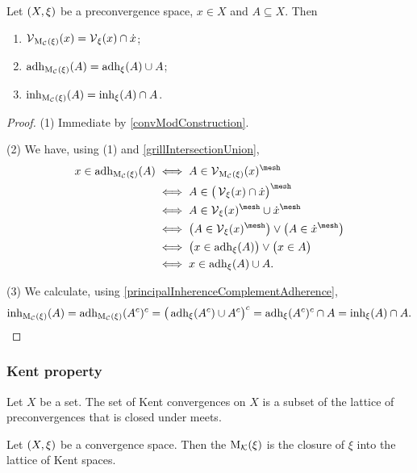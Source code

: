 \begin{proposition} \label{vicinitiesConvergenceModification}
Let $\left( X,\xi \right)$ be a preconvergence space, $x\in X$ and $A\subseteq X$. Then
\begin{enumerate}
\item $\operatorname{\mathcal{V}}_{\operatorname{M_\mathcal{C}}(\xi)}(x) = \operatorname{\mathcal{V}}_{\xi}(x)\cap \dot{x}$;
\item $\operatorname{adh}_{\operatorname{M_\mathcal{C}}(\xi)}(A) = \operatorname{adh}_\xi(A) \cup A$;
\item $\operatorname{inh}_{\operatorname{M_\mathcal{C}}(\xi)}(A) = \operatorname{inh}_\xi(A) \cap A$.
\end{enumerate}
\end{proposition}
\begin{proof}
(1) Immediate by \ref{convModConstruction}.

(2) We have, using (1) and \ref{grillIntersectionUnion},
\begin{align*}
x\in \adh_{\convMod(\xi)}(A) &\iff A\in \vicinity_{\convMod(\xi)}(x)^\mesh \\
&\iff A\in \big(\vicinity_{\xi}(x) \cap \pfilter{x}\big)^\mesh \\
&\iff A\in \vicinity_{\xi}(x)^\mesh \cup \pfilter{x}^\mesh \\
&\iff \big(A\in \vicinity_{\xi}(x)^\mesh\big) \lor \big(A\in \pfilter{x}^\mesh\big) \\
&\iff \big(x\in \adh_\xi(A)\big) \lor \big(x\in A\big) \\
&\iff x \in \adh_\xi(A) \cup A.
\end{align*}

(3) We calculate, using \ref{principalInherenceComplementAdherence},
\[ \operatorname{inh}_{\operatorname{M_\mathcal{C}}(\xi)}(A) = \operatorname{adh}_{\operatorname{M_\mathcal{C}}(\xi)}(A^c)^c = \big(\operatorname{adh}_\xi(A^c)\cup A^c\big)^c = \operatorname{adh}_\xi(A^c)^c \cap A = \operatorname{inh}_\xi(A) \cap A. \]
\end{proof}

\subsubsection{Kent property}
\begin{lemma}
Let $X$ be a set. The set of Kent convergences on $X$ is a subset of the lattice of preconvergences that is closed under meets.
\end{lemma}
\begin{definition}
Let $\left( X,\xi \right)$ be a convergence space. Then the  $\operatorname{M_\mathcal{K}}(\xi)$ is the closure of $\xi$ into the lattice of Kent spaces.
\end{definition}


